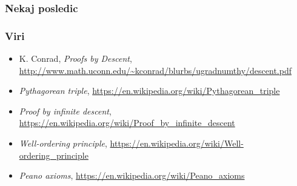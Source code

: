 \documentclass{beamer}
\begin{document}
\begin{frame}
  \frametitle{Nekaj posledic}





\end{frame}
\begin{frame}
  \frametitle{Viri}

\begin{itemize}
	\item K. Conrad, {\em Proofs by Descent},
	\url{http://www.math.uconn.edu/~kconrad/blurbs/ugradnumthy/descent.pdf}
	
	\item {\em Pythagorean triple},	\url{https://en.wikipedia.org/wiki/Pythagorean_triple}
	
	\item {\em Proof by infinite descent}, \url{https://en.wikipedia.org/wiki/Proof_by_infinite_descent}
	
	\item {\em Well-ordering principle}, \url{https://en.wikipedia.org/wiki/Well-ordering_principle}
	
	\item {\em Peano axioms}, \url{https://en.wikipedia.org/wiki/Peano_axioms}


\end{itemize}

\end{frame}
\end{document}

